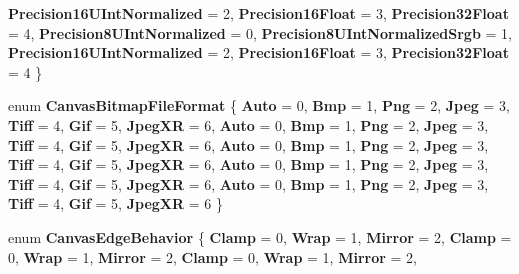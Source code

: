 \begin{DoxyCompactItemize}
{\bfseries Precision16\+U\+Int\+Normalized} = 2, 
{\bfseries Precision16\+Float} = 3, 
{\bfseries Precision32\+Float} = 4, 
\newline
{\bfseries Precision8\+U\+Int\+Normalized} = 0, 
{\bfseries Precision8\+U\+Int\+Normalized\+Srgb} = 1, 
{\bfseries Precision16\+U\+Int\+Normalized} = 2, 
{\bfseries Precision16\+Float} = 3, 
\newline
{\bfseries Precision32\+Float} = 4
 \}
\item 
\mbox{\label{namespace_microsoft_1_1_graphics_1_1_canvas_a912d98ef415ce79b96eeb1280290df73}} 
enum {\bfseries Canvas\+Bitmap\+File\+Format} \{ \newline
{\bfseries Auto} = 0, 
{\bfseries Bmp} = 1, 
{\bfseries Png} = 2, 
{\bfseries Jpeg} = 3, 
\newline
{\bfseries Tiff} = 4, 
{\bfseries Gif} = 5, 
{\bfseries Jpeg\+XR} = 6, 
{\bfseries Auto} = 0, 
\newline
{\bfseries Bmp} = 1, 
{\bfseries Png} = 2, 
{\bfseries Jpeg} = 3, 
{\bfseries Tiff} = 4, 
\newline
{\bfseries Gif} = 5, 
{\bfseries Jpeg\+XR} = 6, 
{\bfseries Auto} = 0, 
{\bfseries Bmp} = 1, 
\newline
{\bfseries Png} = 2, 
{\bfseries Jpeg} = 3, 
{\bfseries Tiff} = 4, 
{\bfseries Gif} = 5, 
\newline
{\bfseries Jpeg\+XR} = 6, 
{\bfseries Auto} = 0, 
{\bfseries Bmp} = 1, 
{\bfseries Png} = 2, 
\newline
{\bfseries Jpeg} = 3, 
{\bfseries Tiff} = 4, 
{\bfseries Gif} = 5, 
{\bfseries Jpeg\+XR} = 6, 
\newline
{\bfseries Auto} = 0, 
{\bfseries Bmp} = 1, 
{\bfseries Png} = 2, 
{\bfseries Jpeg} = 3, 
\newline
{\bfseries Tiff} = 4, 
{\bfseries Gif} = 5, 
{\bfseries Jpeg\+XR} = 6
 \}
\item 
\mbox{\label{namespace_microsoft_1_1_graphics_1_1_canvas_a0820dd282edd1b22994fc94021da353e}} 
enum {\bfseries Canvas\+Edge\+Behavior} \{ \newline
{\bfseries Clamp} = 0, 
{\bfseries Wrap} = 1, 
{\bfseries Mirror} = 2, 
{\bfseries Clamp} = 0, 
\newline
{\bfseries Wrap} = 1, 
{\bfseries Mirror} = 2, 
{\bfseries Clamp} = 0, 
{\bfseries Wrap} = 1, 
\newline
{\bfseries Mirror} = 2, 

\end{DoxyCompactItemize}

